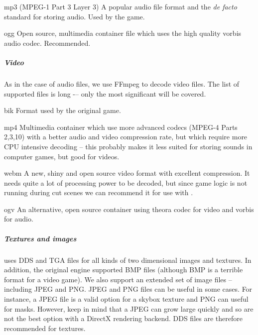 \begin{description}
 \item mp3 ({MPEG}-1 {Part 3 Layer 3}) A popular audio file format and the \textit{de facto} standard for storing audio. Used by 
 the \MW{} game.
 \item ogg Open source, multimedia container file which uses the high quality vorbis audio codec. Recommended.
\end{description}

\subparagraph{Video}
As in the case of audio files, we use {FFmpeg} to decode video files. The list of supported files is long -– only the most 
significant will be covered.

\begin{description}
 \item bik Format used by the original \MW{} game.
 \item mp4 Multimedia container which use more advanced codecs ({MPEG-4 Parts 2,3,10}) with a better audio and video compression rate,
 but which require more {CPU} intensive decoding -- this probably makes it less suited for storing sounds in computer games, but good for videos.
 \item webm A new, shiny and open source video format with excellent compression. It needs quite a lot of processing power to be decoded,
 but since game logic is not running during cut scenes we can recommend it for use with \OMW.
 \item ogv An alternative, open source container using theora codec for video and vorbis for audio.
\end{description}

\subparagraph{Textures and images}
\MW{} uses {DDS} and {TGA} files for all kinds of two dimensional images and textures. In addition, the original engine supported BMP
files (although {BMP} is a terrible format for a video game). We also support an extended set of image files -- including {JPEG} and {PNG}.
JPEG and PNG files can be useful in some cases. For instance, a JPEG file is a valid option for a skybox texture and PNG can useful for masks.
However, keep in mind that a JPEG can grow large quickly and so are not the best option with a {DirectX} rendering backend. DDS files
are therefore recommended for textures. 
